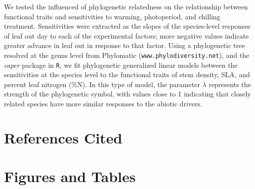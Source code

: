 \documentclass[11pt]{article}
\begin{document}
We tested the influenced of phylogenetic relatedness on the relationship between functional traits and sensitivities to warming, photoperiod, and chilling treatment. Sensitivities were extracted as the slopes of the species-level responses of leaf out day to each of the experimental factors; more negative values indicate greater advance in leaf out in response to that factor. Using a phylogenetic tree resolved at the genus level from Phylomatic (\texttt{www.phylodiversity.net}), and the \emph{caper} package in \texttt{R}, we fit phylogenetic generalized linear models between the sensitivities at the species level to the functional traits of stem density, SLA, and percent leaf nitrogen (\%N). In this type of model, the parameter $\lambda$ represents the strength of the phylogenetic symbol, with values close to 1 indicating that closely related species have more similar responses to the abiotic drivers.

\section*{References Cited}




\section*{Figures and Tables}

\end{document}
